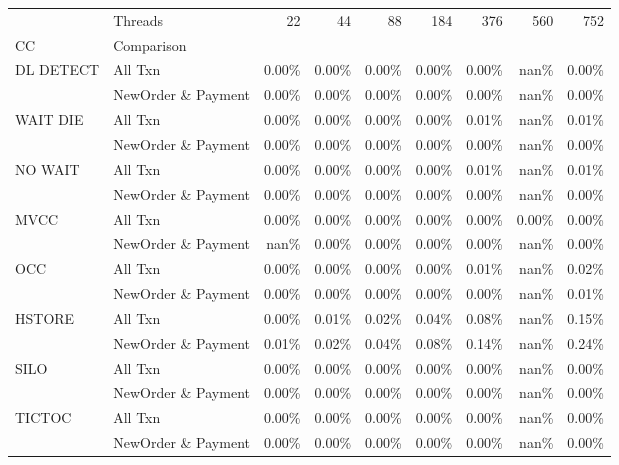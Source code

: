 \begin{tabular}{llrrrrrrr}
\toprule
       & Threads &   22  &   44  &   88  &   184 &   376 &   560 &   752 \\
CC & Comparison &       &       &       &       &       &       &       \\
\midrule
DL DETECT & All Txn & 0.00\% & 0.00\% & 0.00\% & 0.00\% & 0.00\% &  nan\% & 0.00\% \\
       & NewOrder \& Payment & 0.00\% & 0.00\% & 0.00\% & 0.00\% & 0.00\% &  nan\% & 0.00\% \\
WAIT DIE & All Txn & 0.00\% & 0.00\% & 0.00\% & 0.00\% & 0.01\% &  nan\% & 0.01\% \\
       & NewOrder \& Payment & 0.00\% & 0.00\% & 0.00\% & 0.00\% & 0.00\% &  nan\% & 0.00\% \\
NO WAIT & All Txn & 0.00\% & 0.00\% & 0.00\% & 0.00\% & 0.01\% &  nan\% & 0.01\% \\
       & NewOrder \& Payment & 0.00\% & 0.00\% & 0.00\% & 0.00\% & 0.00\% &  nan\% & 0.00\% \\
MVCC & All Txn & 0.00\% & 0.00\% & 0.00\% & 0.00\% & 0.00\% & 0.00\% & 0.00\% \\
       & NewOrder \& Payment &  nan\% & 0.00\% & 0.00\% & 0.00\% & 0.00\% &  nan\% & 0.00\% \\
OCC & All Txn & 0.00\% & 0.00\% & 0.00\% & 0.00\% & 0.01\% &  nan\% & 0.02\% \\
       & NewOrder \& Payment & 0.00\% & 0.00\% & 0.00\% & 0.00\% & 0.00\% &  nan\% & 0.01\% \\
HSTORE & All Txn & 0.00\% & 0.01\% & 0.02\% & 0.04\% & 0.08\% &  nan\% & 0.15\% \\
       & NewOrder \& Payment & 0.01\% & 0.02\% & 0.04\% & 0.08\% & 0.14\% &  nan\% & 0.24\% \\
SILO & All Txn & 0.00\% & 0.00\% & 0.00\% & 0.00\% & 0.00\% &  nan\% & 0.00\% \\
       & NewOrder \& Payment & 0.00\% & 0.00\% & 0.00\% & 0.00\% & 0.00\% &  nan\% & 0.00\% \\
TICTOC & All Txn & 0.00\% & 0.00\% & 0.00\% & 0.00\% & 0.00\% &  nan\% & 0.00\% \\
       & NewOrder \& Payment & 0.00\% & 0.00\% & 0.00\% & 0.00\% & 0.00\% &  nan\% & 0.00\% \\
\bottomrule
\end{tabular}
